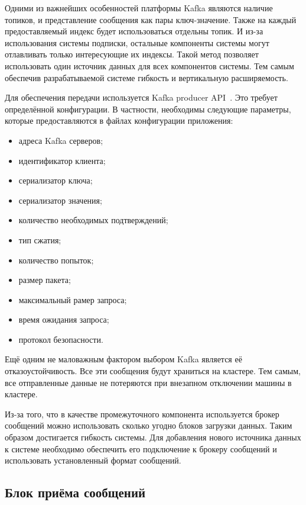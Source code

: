 Одними из важнейших особенностей платформы Kafka являются наличие топиков, и представление сообщения как пары ключ-значение.
Также на каждый предоставляемый индекс будет использоваться отдельны топик.
И из-за использования системы подписки, остальные компоненты системы могут отлавливать только интересующие их индексы.
Такой метод позволяет использовать один источник данных для всех компонентов системы.
Тем самым обеспечив разрабатываемой системе гибкость и вертикальную расширяемость.

Для обеспечения передачи используется Kafka producer API~\cite{kafka_python_producer_api}.
Это требует определённой конфигурации.
В частности, необходимы следующие параметры, которые предоставляются в файлах конфигурации приложения:

\begin{itemize}
    \item адреса Kafka серверов;
    \item идентификатор клиента;
    \item сериализатор ключа;
    \item сериализатор значения;
    \item количество необходимых подтверждений;
    \item тип сжатия;
    \item количество попыток;
    \item размер пакета;
    \item максимальный рамер запроса;
    \item время ожидания запроса;
    \item протокол безопасности.
\end{itemize}


Ещё одним не маловажным фактором выбором Kafka является её отказоустойчивость.
Все эти сообщения будут храниться на кластере.
Тем самым, все отправленные данные не потеряются при внезапном отключении машины в кластере.

Из-за того, что в качестве промежуточного компонента используется брокер сообщений можно использовать сколько угодно блоков загрузки данных.
Таким образом достигается гибкость системы.
Для добавления нового источника данных к системе необходимо обеспечить его подключение к брокеру сообщений и использовать установленный формат сообщений.

\subsection{Блок приёма сообщений}

